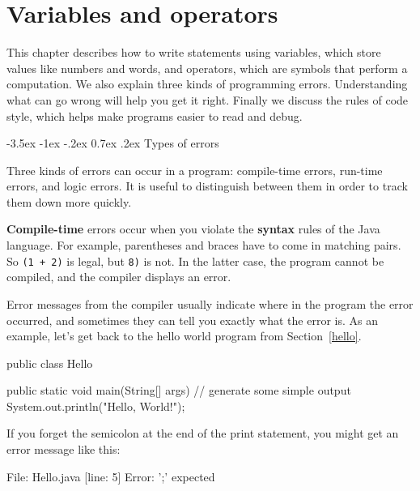 \documentclass[12pt]{book}
\makeatletter
\theoremstyle{exercise}
\newcommand{\java}[1]{\verb"#1"}
\renewcommand{\section}{\@startsection{section}{1}{\z@}%
    {-3.5ex \@plus -1ex \@minus -.2ex}%
    {0.7ex \@plus.2ex}%
    {\normalfont\Large\bfseries}}
\newcommand{\java}[1]{\lstinline{#1}} %
\makeatother
\begin{document}
\chapter{Variables and operators}

This chapter describes how to write statements using variables, which store values like numbers and words, and operators, which are symbols that perform a computation.
We also explain three kinds of programming errors.
Understanding what can go wrong will help you get it right.
Finally we discuss the rules of code style, which helps make programs easier to read and debug.


\section{Types of errors}


Three kinds of errors can occur in a program: compile-time errors, run-time errors, and logic errors.
It is useful to distinguish between them in order to track them down more quickly.


{\bf Compile-time} errors occur when you violate the {\bf syntax} rules of the Java language.
For example, parentheses and braces have to come in matching pairs.
So \java{(1 + 2)} is legal, but \java{8)} is not.
In the latter case, the program cannot be compiled, and the compiler displays an error.


Error messages from the compiler usually indicate where in the program the error occurred, and sometimes they can tell you exactly what the error is.
As an example, let's get back to the hello world program from Section~\ref{hello}.

\begin{code}
public class Hello {

    public static void main(String[] args) {
        // generate some simple output
        System.out.println("Hello, World!");
    }
}
\end{code}

If you forget the semicolon at the end of the print statement, you might get an error message like this:

\begin{stdout}
File: Hello.java  [line: 5]
Error: ';' expected
\end{stdout}
\end{document}
